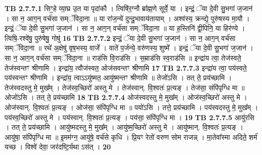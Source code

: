 \documentclass[17pt]{extarticle}
\begin{document}
{                                \textbf{ TB 2.7.7.1} \newline
                  सिꣳ॒॒हे व्या॒घ्र उ॒त या पृदा॑कौ । त्विषि॑र॒ग्नौ ब्रा᳚ह्म॒णे सूर्ये॒ या । इन्द्रं॒ ॅया दे॒वी सु॒भगा॑ ज॒जान॑ । सा न॒ आग॒न् वर्च॑सा सम्ॅविदा॒ना ॥ या रा॑ज॒न्ये॑ दुन्दु॒भावाय॑तायाम् । अश्व॑स्य॒ क्रन्द्ये॒ पुरु॑षस्य मा॒यौ । इन्द्रं॒ ॅया दे॒वी सु॒भगा॑ ज॒जान॑ । सा न॒ आग॒न् वर्च॑सा सम्ॅविदा॒ना ॥ या ह॒स्तिनि॑ द्वी॒पिनि॒ या हिर॑ण्ये । त्विषि॒-रश्वे॑षु॒ पुरु॑षेषु॒ गोषु॑ \textbf{ 16} \newline
                  \newline
                                \textbf{ TB 2.7.7.2} \newline
                  इन्द्रं॒ ॅया दे॒वी सु॒भगा॑ ज॒जान॑ । सा न॒ आग॒न् वर्च॑सा सम्ॅविदा॒ना ॥ रथे॑ अ॒क्षेषु॑ वृष॒भस्य॒ वाजे᳚ । वाते॑ प॒र्जन्ये॒ वरु॑णस्य॒ शुष्मे᳚ । इन्द्रं॒ ॅया दे॒वी सु॒भगा॑ ज॒जान॑ । सा न॒ आग॒न् वर्च॑सा सम्ॅविदा॒ना ॥ राड॑सि वि॒राड॑सि । स॒म्राड॑सि स्व॒राड॑सि ॥ इन्द्रा॑य त्वा॒ तेज॑स्वते॒ तेज॑स्वन्तꣳ श्रीणामि । इन्द्रा॑य॒ त्वौज॑स्वत॒ ओज॑सवन्तꣳ श्रीणामि \textbf{ 17} \newline
                  \newline
                                \textbf{ TB 2.7.7.3} \newline
                  इन्द्रा॑य त्वा॒ पय॑स्वते॒ पय॑स्वन्तꣳ श्रीणामि । इन्द्रा॑य॒ त्वाऽऽयु॑ष्मत॒ आयु॑ष्मन्तꣳ श्रीणामि ॥ तेजो॑ऽसि । तत् ते॒ प्रय॑च्छामि । तेज॑स्वदस्तु मे॒ मुख᳚म् । तेज॑स्व॒च्छिरो॑ अस्तु मे । तेज॑स्वान्. वि॒श्वतः॑ प्र॒त्यङ् । तेज॑सा॒ संपि॑पृग्धि मा ॥ ओजो॑ऽसि । तत् ते॒ प्रय॑च्छामि \textbf{ 18} \newline
                  \newline
                                \textbf{ TB 2.7.7.4} \newline
                  ओज॑स्वदस्तु मे॒ मुख᳚म् । ओज॑स्व॒च्छिरो॑ अस्तु मे । ओज॑स्वान्. वि॒श्वतः॑ प्र॒त्यङ् । ओज॑सा॒ संपि॑पृग्धि मा ॥ पयो॑ऽसि । तत्ते॒ प्रय॑च्छामि । पय॑स्वदस्तु मे॒ मुख᳚म् । पय॑स्व॒च्छिरो॑ अस्तु मे । पय॑स्वान्. वि॒श्वतः॑ प्र॒त्यङ् । पय॑सा॒ संपि॑पृग्धि मा । \textbf{ 19} \newline
                  \newline
                                \textbf{ TB 2.7.7.5} \newline
                  आयु॑रसि । तत् ते॒ प्रय॑च्छामि । आयु॑ष्मदस्तु मे॒ मुख᳚म् । आयु॑ष्म॒च्छिरो॑ अस्तु मे । आयु॑ष्मान्. वि॒श्वतः॑ प्र॒त्यङ् । आयु॑षा॒ संपि॑पृग्धि मा ॥ इ॒मम॑ग्न॒ आयु॑षे॒ वर्च॑से कृधि । प्रि॒यꣳ रेतो॑ वरुण सोम राजन्न् । मा॒तेवा᳚स्मा अदिते॒ शर्म॑ यच्छ । विश्वे॑ देवा॒ जर॑दष्टि॒र्यथा ऽस॑त् । \textbf{ 20} \newline
}
\end{document}
